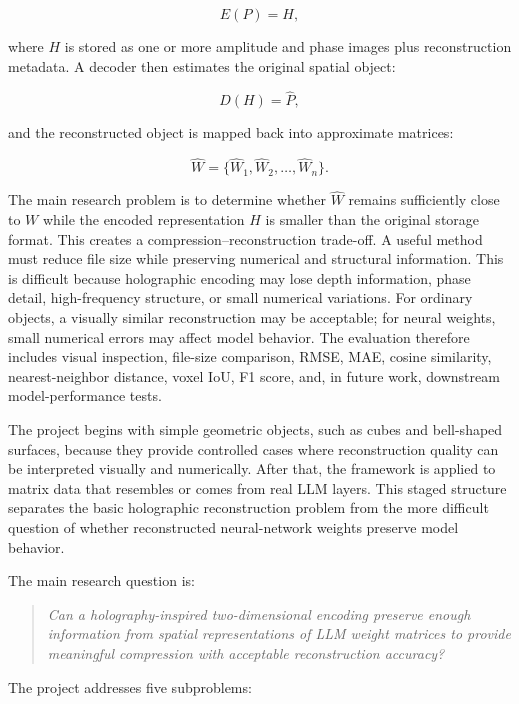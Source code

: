 \documentclass{article}
\begin{document}
\begin{normalsize}
\[
E(P) = H,
\]

where \(H\) is stored as one or more amplitude and phase images plus reconstruction metadata. A decoder then estimates the original spatial object:

\[
D(H) = \hat{P},
\]

and the reconstructed object is mapped back into approximate matrices:

\[
\hat{W} = \{\hat{W}_1, \hat{W}_2, \ldots, \hat{W}_n\}.
\]

The main research problem is to determine whether \(\hat{W}\) remains sufficiently close to \(W\) while the encoded representation \(H\) is smaller than the original storage format. This creates a compression--reconstruction trade-off. A useful method must reduce file size while preserving numerical and structural information. This is difficult because holographic encoding may lose depth information, phase detail, high-frequency structure, or small numerical variations. For ordinary objects, a visually similar reconstruction may be acceptable; for neural weights, small numerical errors may affect model behavior. The evaluation therefore includes visual inspection, file-size comparison, RMSE, MAE, cosine similarity, nearest-neighbor distance, voxel IoU, F1 score, and, in future work, downstream model-performance tests.

The project begins with simple geometric objects, such as cubes and bell-shaped surfaces, because they provide controlled cases where reconstruction quality can be interpreted visually and numerically. After that, the framework is applied to matrix data that resembles or comes from real LLM layers. This staged structure separates the basic holographic reconstruction problem from the more difficult question of whether reconstructed neural-network weights preserve model behavior.

The main research question is:

\begin{quote}
\textit{Can a holography-inspired two-dimensional encoding preserve enough information from spatial representations of LLM weight matrices to provide meaningful compression with acceptable reconstruction accuracy?}
\end{quote}

The project addresses five subproblems:


\end{normalsize}
\end{document}

